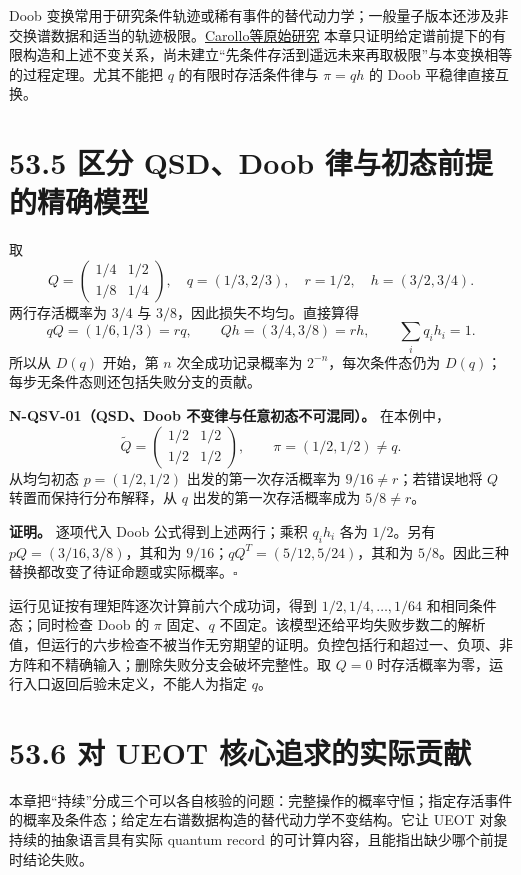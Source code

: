 \documentclass[
  11pt,
  oneside]{book}
\begin{document}
Doob
变换常用于研究条件轨迹或稀有事件的替代动力学；一般量子版本还涉及非交换谱数据和适当的轨迹极限。\href{https://arxiv.org/abs/1711.10951}{Carollo等原始研究}
本章只证明给定谱前提下的有限构造和上述不变关系，尚未建立``先条件存活到遥远未来再取极限''与本变换相等的过程定理。尤其不能把
\(q\) 的有限时存活条件律与 \(\pi=qh\) 的 Doob 平稳律直接互换。

\section{53.5 区分 QSD、Doob 律与初态前提的精确模型}

取 \[
Q=\begin{pmatrix}1/4&1/2\\1/8&1/4\end{pmatrix},\quad
q=(1/3,2/3),\quad r=1/2,\quad h=(3/2,3/4).
\] 两行存活概率为 \(3/4\) 与 \(3/8\)，因此损失不均匀。直接算得 \[
qQ=(1/6,1/3)=rq,\qquad
Qh=(3/4,3/8)=rh,\qquad \sum_iq_ih_i=1.
\] 所以从 \(D(q)\) 开始，第 \(n\) 次全成功记录概率为
\(2^{-n}\)，每次条件态仍为
\(D(q)\)；每步无条件态则还包括失败分支的贡献。

\protect\hypertarget{n-qsv-01}{}{}

\textbf{N-QSV-01（QSD、Doob 不变律与任意初态不可混同）。} 在本例中， \[
\widetilde Q=\begin{pmatrix}1/2&1/2\\1/2&1/2\end{pmatrix},\qquad
\pi=(1/2,1/2)\ne q.
\] 从均匀初态 \(p=(1/2,1/2)\) 出发的第一次存活概率为
\(9/16\ne r\)；若错误地将 \(Q\) 转置而保持行分布解释，从 \(q\)
出发的第一次存活概率成为 \(5/8\ne r\)。

\textbf{证明。} 逐项代入 Doob 公式得到上述两行；乘积 \(q_ih_i\) 各为
\(1/2\)。另有 \(pQ=(3/16,3/8)\)，其和为
\(9/16\)；\(qQ^T=(5/12,5/24)\)，其和为
\(5/8\)。因此三种替换都改变了待证命题或实际概率。\(\square\)

运行见证按有理矩阵逐次计算前六个成功词，得到 \(1/2,1/4,\ldots,1/64\)
和相同条件态；同时检查 Doob 的 \(\pi\) 固定、\(q\)
不固定。该模型还给平均失败步数二的解析值，但运行的六步检查不被当作无穷期望的证明。负控包括行和超过一、负项、非方阵和不精确输入；删除失败分支会破坏完整性。取
\(Q=0\) 时存活概率为零，运行入口返回后验未定义，不能人为指定 \(q\)。

\section{53.6 对 UEOT 核心追求的实际贡献}

本章把``持续''分成三个可以各自核验的问题：完整操作的概率守恒；指定存活事件的概率及条件态；给定左右谱数据构造的替代动力学不变结构。它让
UEOT 对象持续的抽象语言具有实际 quantum record
的可计算内容，且能指出缺少哪个前提时结论失败。
\end{document}
